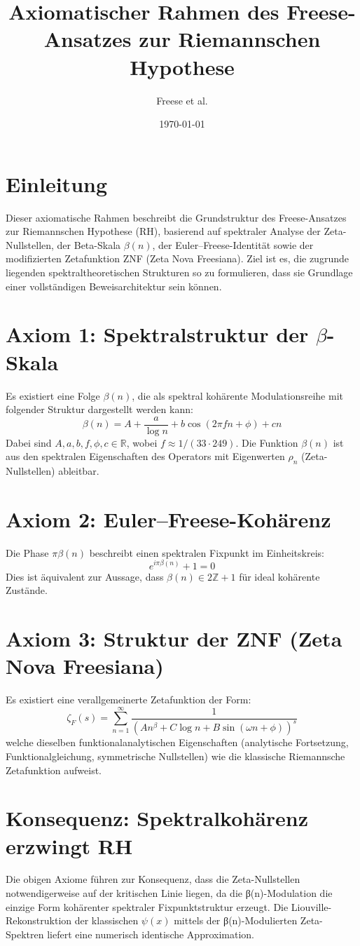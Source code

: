 \documentclass[12pt]{article}
\title{\textbf{Axiomatischer Rahmen des Freese-Ansatzes zur Riemannschen Hypothese}}
\author{Freese et al.}
\date{\today}
\begin{document}
\maketitle

\section*{Einleitung}
Dieser axiomatische Rahmen beschreibt die Grundstruktur des Freese-Ansatzes zur Riemannschen Hypothese (RH), basierend auf spektraler Analyse der Zeta-Nullstellen, der Beta-Skala \(\beta(n)\), der Euler–Freese-Identität sowie der modifizierten Zetafunktion ZNF (Zeta Nova Freesiana). Ziel ist es, die zugrunde liegenden spektraltheoretischen Strukturen so zu formulieren, dass sie Grundlage einer vollständigen Beweisarchitektur sein können.

\section*{Axiom 1: Spektralstruktur der \(\beta\)-Skala}
Es existiert eine Folge \(\beta(n)\), die als spektral kohärente Modulationsreihe mit folgender Struktur dargestellt werden kann:
\[
\beta(n) = A + \frac{a}{\log n} + b \cos(2\pi f n + \phi) + c n
\]
Dabei sind \(A, a, b, f, \phi, c \in \mathbb{R}\), wobei \(f \approx 1 / (33 \cdot 249)\). Die Funktion \(\beta(n)\) ist aus den spektralen Eigenschaften des Operators mit Eigenwerten \(\rho_n\) (Zeta-Nullstellen) ableitbar.

\section*{Axiom 2: Euler–Freese-Kohärenz}
Die Phase \(\pi \beta(n)\) beschreibt einen spektralen Fixpunkt im Einheitskreis:
\[
e^{i\pi \beta(n)} + 1 = 0
\]
Dies ist äquivalent zur Aussage, dass \(\beta(n) \in 2\mathbb{Z} + 1\) für ideal kohärente Zustände.

\section*{Axiom 3: Struktur der ZNF (Zeta Nova Freesiana)}
Es existiert eine verallgemeinerte Zetafunktion der Form:
\[
\zeta_F(s) = \sum_{n=1}^\infty \frac{1}{\left(A n^\beta + C \log n + B \sin(\omega n + \phi)\right)^s}
\]
welche dieselben funktionalanalytischen Eigenschaften (analytische Fortsetzung, Funktionalgleichung, symmetrische Nullstellen) wie die klassische Riemannsche Zetafunktion aufweist.

\section*{Konsequenz: Spektralkohärenz erzwingt RH}
Die obigen Axiome führen zur Konsequenz, dass die Zeta-Nullstellen notwendigerweise auf der kritischen Linie liegen, da die β(n)-Modulation die einzige Form kohärenter spektraler Fixpunktstruktur erzeugt. Die Liouville-Rekonstruktion der klassischen \(\psi(x)\) mittels der β(n)-Modulierten Zeta-Spektren liefert eine numerisch identische Approximation.
\end{document}
